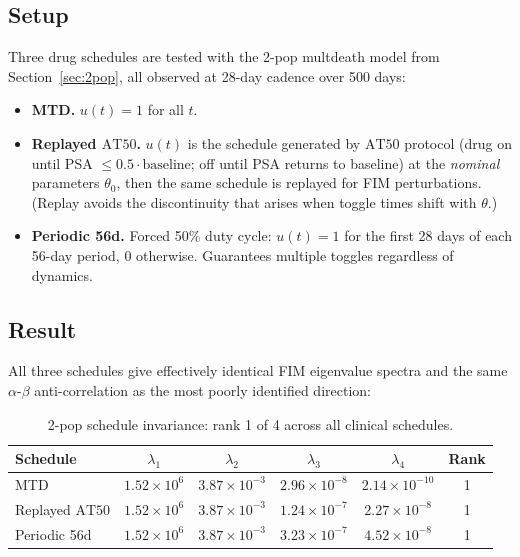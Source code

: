 \documentclass[11pt]{article}
\newcommand{\AT}{\mathrm{AT}}
\begin{document}
\subsection{Setup}

Three drug schedules are tested with the 2-pop multdeath model from
Section~\ref{sec:2pop}, all observed at 28-day cadence over 500 days:

\begin{itemize}
\item \textbf{MTD.} $u(t) = 1$ for all $t$.
\item \textbf{Replayed $\AT 50$.} $u(t)$ is the schedule generated by $\AT 50$ protocol (drug on until PSA $\le 0.5 \cdot \text{baseline}$; off until PSA returns to baseline) at the \emph{nominal} parameters $\theta_0$, then the same schedule is replayed for FIM perturbations. (Replay avoids the discontinuity that arises when toggle times shift with $\theta$.)
\item \textbf{Periodic 56d.} Forced 50\% duty cycle: $u(t) = 1$ for the first 28 days of each 56-day period, $0$ otherwise. Guarantees multiple toggles regardless of dynamics.
\end{itemize}

\subsection{Result}

All three schedules give effectively identical FIM eigenvalue spectra and the
same $\alpha$-$\beta$ anti-correlation as the most poorly identified direction:

\begin{table}[h]
\centering
\begin{tabular}{lccccc}
\toprule
Schedule & $\lambda_1$ & $\lambda_2$ & $\lambda_3$ & $\lambda_4$ & Rank \\
\midrule
MTD & $1.52 \times 10^6$ & $3.87 \times 10^{-3}$ & $2.96 \times 10^{-8}$ & $2.14 \times 10^{-10}$ & 1 \\
Replayed $\AT 50$ & $1.52 \times 10^6$ & $3.87 \times 10^{-3}$ & $1.24 \times 10^{-7}$ & $2.27 \times 10^{-8}$ & 1 \\
Periodic 56d & $1.52 \times 10^6$ & $3.87 \times 10^{-3}$ & $3.23 \times 10^{-7}$ & $4.52 \times 10^{-8}$ & 1 \\
\bottomrule
\end{tabular}
\caption{2-pop schedule invariance: rank 1 of 4 across all clinical schedules.}
\end{table}
\end{document}
